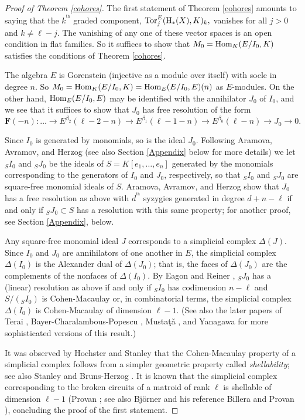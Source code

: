 \documentclass{tran-l}
\theoremstyle{definition}
\theoremstyle{remark}
\newcommand{\thh}{{^{\mathrm {th}}}}
\newcommand{\FF}{{\mathbf{F}}}
\newcommand{\Hom}{\mathop{\rm Hom}\nolimits}
\newcommand{\Tor}{\mathop{\rm Tor}\nolimits}
\newcommand{\rH}{{\mathrm H}}
\begin{document}
\begin{proof}[Proof of Theorem \ref{cohores}]
The first statement of Theorem \ref{cohores} amounts to saying that the
$k^\thh$ graded component, $\Tor_j^E(\rH_*(X), K)_k,$ vanishes for all $j>0$
and  $k\neq \ell-j$. The vanishing of any one of these vector spaces is an open
condition in flat families. So it suffices to show that  $M_0=\Hom_K(E/I_0, 
K)$ satisfies the conditions of  Theorem \ref{cohores}. 

The algebra $E$ is Gorenstein (injective as a module over itself) with
socle in degree $n$. So
$M_0=\Hom_K(E/I_0,  K)=\Hom_E(E/I_0, E)(n)$ as $E$-modules. 
On the other hand, $\Hom_E(E/I_0, E)$ may be identified with the
annihilator $J_0$ of $I_0$, and we see that it suffices to show
that $J_0$ has free resolution of the form
\[
\FF(-n):
\dots\to 
E^{\beta_2}(\ell-2-n)\to 
E^{\beta_1}(\ell-1-n)\to 
E^{\beta_0}(\ell-n)\to 
J_0\to 0.
\]

Since $I_0$ is generated by monomials, so is the ideal $J_0$.
Following Aramova, Avramov, and Herzog \cite{AAH} (see also 
Section \ref{Appendix} below for more details) we let $_SI_0$ and $_SJ_0$
be the ideals of $S= K[e_1,\ldots,e_n]$ generated by the monomials
corresponding to the generators of $I_0$ and $J_0$, respectively, so
that $_SI_0$ and $_SJ_0$ are square-free monomial ideals of $S$.
Aramova, Avramov, and Herzog \cite{AAH} show that $J_0$ has a free
resolution as above with $d^\thh$ syzygies generated in degree
$d+n-\ell$ if and only if $_SJ_0\subset S$ has a resolution with this
same property; for another proof, see Section \ref{Appendix}, below.

Any square-free monomial ideal $J$ corresponds to a simplicial
complex $\Delta(J)$. Since $I_0$ and $J_0$ are
annihilators of one another in $E$, the simplicial complex
$\Delta(I_0)$ is the Alexander dual of $\Delta(J_0)$; that is, the
faces of $\Delta(J_0)$ are the complements of the nonfaces of
$\Delta(I_0)$. By Eagon and Reiner \cite{ER}, $_SJ_0$ has a (linear) resolution 
as above if and only if $_SI_0$ has codimension $n-\ell$ and $S/(_SI_0)$ is
Cohen-Macaulay or, in combinatorial terms, the simplicial complex
$\Delta(I_0)$ is Cohen-Macaulay of dimension $\ell-1$. (See also the
later papers of Terai \cite{Te}, Bayer-Charalambous-Popescu \cite{BCP},
Musta\c t\v a \cite{Mu}, and Yanagawa \cite{Ya} for
more sophisticated versions of this result.)

It was observed by Hochster \cite{Ho1} and Stanley \cite{St2}
that the Cohen-Macaulay property of
a simplicial complex follows from a simpler geometric property called {\it
shellability\/}; see also Stanley \cite[Theorem 2.5]{St1} and 
Bruns-Herzog \cite[Theorem 5.1.13]{BH1}.  It is known that the
simplicial complex corresponding to the broken circuits of a matroid
of rank $\ell$ is shellable of dimension $\ell-1$ (Provan \cite{Pr};
see also Bj\"orner \cite[7.4.2(ii) and 7.4.3]{Bjo2} and his reference
Billera and Provan \cite{BP}),
concluding the proof of the first statement.


\end{proof}
\end{document}
